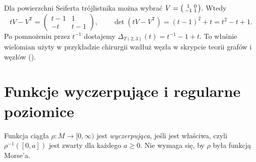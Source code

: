 \begin{przyklad}
Dla powierzchni Seiferta trójlistnika można wybrać
$V=\begin{psmallmatrix}1&0\\-1&1\end{psmallmatrix}$.
Wtedy
\[
 tV-V^{\mathsf T}
 =\begin{pmatrix}t-1&1\\-t&t-1\end{pmatrix},
 \qquad \det(tV-V^{\mathsf T})=(t-1)^2+t=t^2-t+1.
\]
Po pomnożeniu przez $t^{-1}$ dostajemy
$\Delta_{T(2,3)}(t)=t^{-1}-1+t$.
To właśnie wielomian użyty w przykładzie chirurgii
wzdłuż węzła w skrypcie teorii grafów i węzłów
().
\end{przyklad}

\section{Funkcje wyczerpujące i regularne poziomice}
\label{sec:wyczerpujace-15}

\begin{definicja}
\label{def:wyczerpujaca-15}
Funkcja ciągła $\rho:M\to[0,\infty)$ jest
\emph{wyczerpująca}, jeśli jest właściwa,
czyli $\rho^{-1}([0,a])$ jest zwarty
dla każdego $a\geq0$.
Nie wymaga się, by $\rho$ była
funkcją Morse'a.
\end{definicja}

